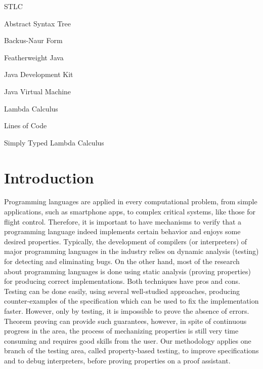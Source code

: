 \documentclass[tese,capa,english]{texufpel}
\begin{document}
\listoffigures

\listoftables

\begin{listofabbrv}{STLC}%
        \item[AST] Abstract Syntax Tree
        \item[BNF] Backus-Naur Form
        \item[FJ] Featherweight Java
        \item[JDK] Java Development Kit
        \item[JVM] Java Virtual Machine
        \item[LC] Lambda Calculus
        \item[LOC] Lines of Code
        \item[STLC] Simply Typed Lambda Calculus
\end{listofabbrv}

\tableofcontents

\chapter{Introduction}

Programming languages are applied in every computational problem, from simple applications, such as smartphone apps, to complex critical systems, like those for flight control. Therefore, it is important to have mechanisms to verify that a programming language indeed implements certain behavior and enjoys some desired properties. Typically, the development of compilers (or interpreters) of major programming languages in the industry relies on dynamic analysis (testing) for detecting and eliminating bugs. On the other hand, most of the research about programming languages is done using static analysis (proving properties) for producing correct implementations. Both techniques have pros and cons. Testing can be done easily, using several well-studied approaches, producing counter-examples of the specification which can be used to fix the implementation faster. However, only by testing, it is impossible to prove the absence of errors. Theorem proving can provide such guarantees, however, in spite of continuous progress in the area, the process of mechanizing properties is still very time consuming and requires good skills from the user. Our methodology applies one branch of the testing area, called property-based testing, to improve specifications and to debug interpreters, before proving properties on a proof assistant.
\end{document}
